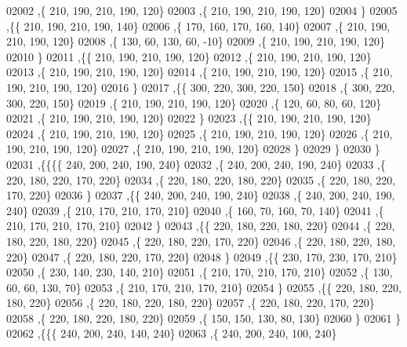 \begin{DoxyCode}
02002     ,\{   210,   190,   210,   190,   120\}
02003     ,\{   210,   190,   210,   190,   120\}
02004     \}
02005    ,\{\{   210,   190,   210,   190,   140\}
02006     ,\{   170,   160,   170,   160,   140\}
02007     ,\{   210,   190,   210,   190,   120\}
02008     ,\{   130,    60,   130,    60,   -10\}
02009     ,\{   210,   190,   210,   190,   120\}
02010     \}
02011    ,\{\{   210,   190,   210,   190,   120\}
02012     ,\{   210,   190,   210,   190,   120\}
02013     ,\{   210,   190,   210,   190,   120\}
02014     ,\{   210,   190,   210,   190,   120\}
02015     ,\{   210,   190,   210,   190,   120\}
02016     \}
02017    ,\{\{   300,   220,   300,   220,   150\}
02018     ,\{   300,   220,   300,   220,   150\}
02019     ,\{   210,   190,   210,   190,   120\}
02020     ,\{   120,    60,    80,    60,   120\}
02021     ,\{   210,   190,   210,   190,   120\}
02022     \}
02023    ,\{\{   210,   190,   210,   190,   120\}
02024     ,\{   210,   190,   210,   190,   120\}
02025     ,\{   210,   190,   210,   190,   120\}
02026     ,\{   210,   190,   210,   190,   120\}
02027     ,\{   210,   190,   210,   190,   120\}
02028     \}
02029    \}
02030   \}
02031  ,\{\{\{\{   240,   200,   240,   190,   240\}
02032     ,\{   240,   200,   240,   190,   240\}
02033     ,\{   220,   180,   220,   170,   220\}
02034     ,\{   220,   180,   220,   180,   220\}
02035     ,\{   220,   180,   220,   170,   220\}
02036     \}
02037    ,\{\{   240,   200,   240,   190,   240\}
02038     ,\{   240,   200,   240,   190,   240\}
02039     ,\{   210,   170,   210,   170,   210\}
02040     ,\{   160,    70,   160,    70,   140\}
02041     ,\{   210,   170,   210,   170,   210\}
02042     \}
02043    ,\{\{   220,   180,   220,   180,   220\}
02044     ,\{   220,   180,   220,   180,   220\}
02045     ,\{   220,   180,   220,   170,   220\}
02046     ,\{   220,   180,   220,   180,   220\}
02047     ,\{   220,   180,   220,   170,   220\}
02048     \}
02049    ,\{\{   230,   170,   230,   170,   210\}
02050     ,\{   230,   140,   230,   140,   210\}
02051     ,\{   210,   170,   210,   170,   210\}
02052     ,\{   130,    60,    60,   130,    70\}
02053     ,\{   210,   170,   210,   170,   210\}
02054     \}
02055    ,\{\{   220,   180,   220,   180,   220\}
02056     ,\{   220,   180,   220,   180,   220\}
02057     ,\{   220,   180,   220,   170,   220\}
02058     ,\{   220,   180,   220,   180,   220\}
02059     ,\{   150,   150,   130,    80,   130\}
02060     \}
02061    \}
02062   ,\{\{\{   240,   200,   240,   140,   240\}
02063     ,\{   240,   200,   240,   100,   240\}

\end{DoxyCode}

